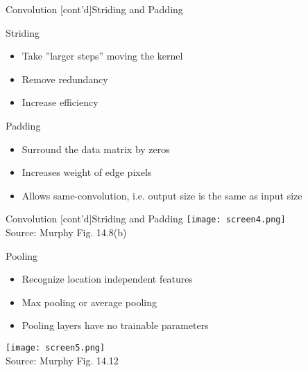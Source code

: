 \documentclass[ignorenonframetext,xcolor=x11names]{beamer}
\begin{document}
\begin{frame}{Convolution \small [cont'd]}{Striding and Padding}
\begin{block}{Striding}
   \begin{itemize} 
       \item Take ''larger steps'' moving the kernel
       \item Remove redundancy
       \item Increase efficiency
   \end{itemize}
\end{block}
\begin{block}{Padding}
   \begin{itemize}
       \item Surround the data matrix by zeros
       \item Increases weight of edge pixels
       \item Allows same-convolution, i.e. output size is the same as input size
   \end{itemize}
\end{block}
\end{frame}

\begin{frame}{Convolution \small [cont'd]}{Striding and Padding}
\centering
\texttt{[image: screen4.png]} \\

\scriptsize Source: Murphy Fig. 14.8(b)
\end{frame}

\begin{frame}{Pooling}
\begin{itemize}
   \item Recognize location independent features
   \item Max pooling or average pooling
   \item Pooling layers have no trainable parameters
\end{itemize}
\centering
\texttt{[image: screen5.png]} \\

\scriptsize Source: Murphy Fig. 14.12
\end{frame}
\end{document}
